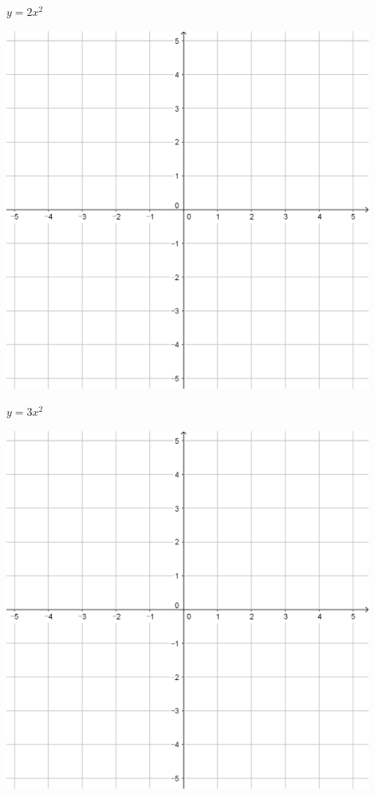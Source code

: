 \documentclass{oblivoir}
\begin{document}
\begin{minipage}{0.45\textwidth}\centering
\(y=2x^2\)
\par\bigskip\includegraphics[width=0.9\textwidth]{55}
\end{minipage}
\begin{minipage}{0.45\textwidth}\centering
\(y=3x^2\)
\par\bigskip\includegraphics[width=0.9\textwidth]{55}
\end{minipage}\bigskip\bigskip\par
\end{document}
